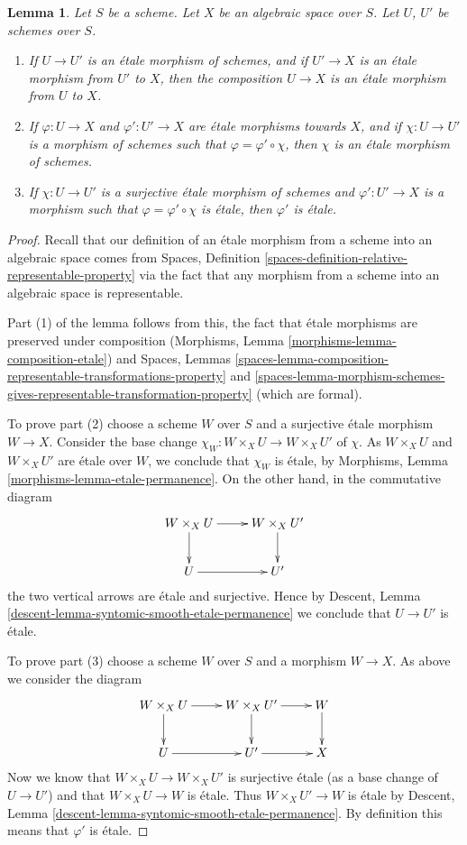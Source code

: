\documentclass{stacks-project}
\theoremstyle{plain}
\newtheorem{lemma}[subsection]{Lemma}
\theoremstyle{definition}
\theoremstyle{remark}
\numberwithin{equation}{subsection}
\begin{document}
\begin{lemma}
\label{lemma-etale-over-space}
Let $S$ be a scheme.
Let $X$ be an algebraic space over $S$.
Let $U$, $U'$ be schemes over $S$.
\begin{enumerate}
\item If $U \to U'$ is an \'etale morphism of schemes, and
if $U' \to X$ is an \'etale morphism from $U'$ to $X$, then the
composition $U \to X$ is an \'etale morphism from $U$ to $X$.
\item If $\varphi : U \to X$ and $\varphi' : U' \to X$ are
\'etale morphisms towards $X$, and if $\chi : U \to U'$ is a
morphism of schemes such that $\varphi = \varphi' \circ \chi$,
then $\chi$ is an \'etale morphism of schemes.
\item If $\chi : U \to U'$ is a surjective \'etale morphism
of schemes and $\varphi' : U' \to X$ is a morphism such that
$\varphi = \varphi' \circ \chi$ is \'etale, then $\varphi'$
is \'etale.
\end{enumerate}
\end{lemma}

\begin{proof}
Recall that our definition of an \'etale morphism from a scheme into an
algebraic space comes from
Spaces, Definition
\ref{spaces-definition-relative-representable-property}
via the fact that any morphism from a scheme into an algebraic space
is representable.

\medskip\noindent
Part (1) of the lemma follows from this, the fact that
\'etale morphisms are preserved under composition
(Morphisms, Lemma
\ref{morphisms-lemma-composition-etale})
and
Spaces, Lemmas
\ref{spaces-lemma-composition-representable-transformations-property} and
\ref{spaces-lemma-morphism-schemes-gives-representable-transformation-property}
(which are formal).

\medskip\noindent
To prove part (2) choose a scheme $W$ over $S$ and a
surjective \'etale morphism $W \to X$. Consider the base change
$\chi_W : W \times_X U \to W \times_X U'$ of $\chi$.
As $W \times_X U$ and $W \times_X U'$ are \'etale over $W$, we conclude that
$\chi_W$ is \'etale, by
Morphisms, Lemma \ref{morphisms-lemma-etale-permanence}.
On the other hand, in the commutative diagram
$$
\xymatrix{
W \times_X U \ar[r] \ar[d] & W \times_X U' \ar[d] \\
U \ar[r] & U'
}
$$
the two vertical arrows are \'etale and surjective.
Hence by
Descent, Lemma \ref{descent-lemma-syntomic-smooth-etale-permanence}
we conclude that $U \to U'$ is \'etale.

\medskip\noindent
To prove part (3) choose a scheme $W$ over $S$ and a morphism $W \to X$.
As above we consider the diagram
$$
\xymatrix{
W \times_X U \ar[r] \ar[d] & W \times_X U' \ar[d] \ar[r] & W \ar[d] \\
U \ar[r] & U' \ar[r] & X
}
$$
Now we know that $W \times_X U \to W \times_X U'$ is surjective \'etale
(as a base change of $U \to U'$)
and that $W \times_X U \to W$ is \'etale. Thus $W \times_X U' \to W$
is \'etale by Descent, Lemma
\ref{descent-lemma-syntomic-smooth-etale-permanence}. By definition
this means that $\varphi'$ is \'etale.
\end{proof}
\end{document}
